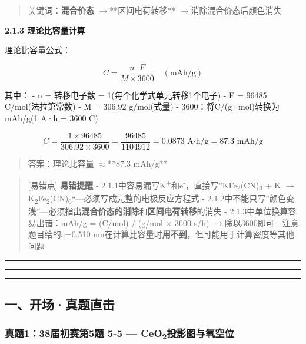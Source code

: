 \documentclass[a4paper,11pt]{ctexart}
\newcommand{\箭}{\ensuremath{\rightarrow}}
\newcommand{\左箭}{\ensuremath{\leftarrow}}
\newcommand{\上箭}{\ensuremath{\uparrow}}
\newcommand{\下箭}{\ensuremath{\downarrow}}
\newcommand{\衡}{\ensuremath{\rightleftharpoons}}
\newcommand{\双箭}{\ensuremath{\leftrightarrow}}
\newcommand{\约等于}{\ensuremath{\approx}}
\newcommand{\小于等于}{\ensuremath{\leq}}
\newcommand{\大于等于}{\ensuremath{\geq}}
\newcommand{\不等于}{\ensuremath{\neq}}
\newcommand{\西格马}{\ensuremath{\sigma}}
\newcommand{\派}{\ensuremath{\pi}}
\begin{document}
\begin{quote}
关键词：\textbf{混合价态} \箭 **区间电荷转移** \箭 消除混合价态后颜色消失
\end{quote}

\textbf{2.1.3 理论比容量计算}

理论比容量公式：

\[C = \frac{n \cdot F}{M \times 3600} \quad (\text{mAh/g})\]

其中：
- n = 转移电子数 = 1(每个化学式单元转移1个电子)
- F = 96485 C/mol(法拉第常数)
- M = 306.92 g/mol(式量)
- 3600：将C/(g·mol)转换为mAh/g(1 A·h = 3600 C)

\[C = \frac{1 \times 96485}{306.92 \times 3600} = \frac{96485}{1104912} = 0.0873 \text{ A·h/g} = 87.3 \text{ mAh/g}\]

\begin{quote}
答案：理论比容量 \约等于 **87.3 mAh/g**
\end{quote}

\begin{quote}
{[}易错点{]} \textbf{易错提醒}
- 2.1.1中容易漏写K\textsuperscript{+}和e\textsuperscript{-}，直接写''KFe\textsubscript{2}(CN)\textsubscript{6} + K \箭 K\textsubscript{2}Fe\textsubscript{2}(CN)\textsubscript{6}``---必须写成完整的电极反应方程式
- 2.1.2中不能只写''颜色变浅''---必须指出\textbf{混合价态的消除}和\textbf{区间电荷转移}的消失
- 2.1.3中单位换算容易出错：mAh/g = (C/mol) / (g/mol × 3600 s/h) \箭 除以3600即可
- 注意题目给的a=0.510 nm在计算比容量时\textbf{用不到}，但可能用于计算密度等其他问题
\end{quote}

\begin{center}\rule{0.5\linewidth}{0.5pt}\end{center}

\begin{center}\rule{0.5\linewidth}{0.5pt}\end{center}

\begin{center}\rule{0.5\linewidth}{0.5pt}\end{center}

\subsection{一、开场·真题直击}\label{ux4e00ux5f00ux573aux771fux9898ux76f4ux51fb-3}

\subsubsection{\texorpdfstring{真题1：38届初赛第5题 5-5 --- CeO\textsubscript{2}投影图与氧空位}{真题1：38届初赛第5题 5-5 --- CeO2投影图与氧空位}}\label{ux771fux9898138ux5c4aux521dux8d5bux7b2c5ux9898-5-5-ceo2ux6295ux5f71ux56feux4e0eux6c27ux7a7aux4f4d}
\end{document}
